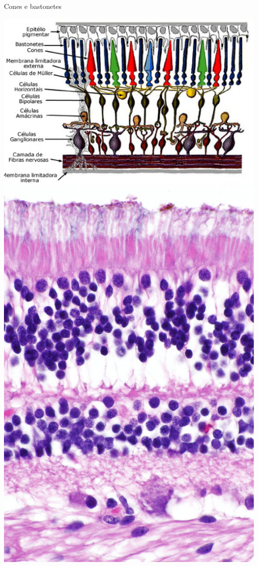      \begin{slide}[toc=]{Cones e bastonetes}
         \begin{center}
            \includegraphics[height=.65\textheight]{figs/retina}
            \includegraphics[height=.65\textheight]{figs/retina2}
         \end{center}
      \end{slide}

